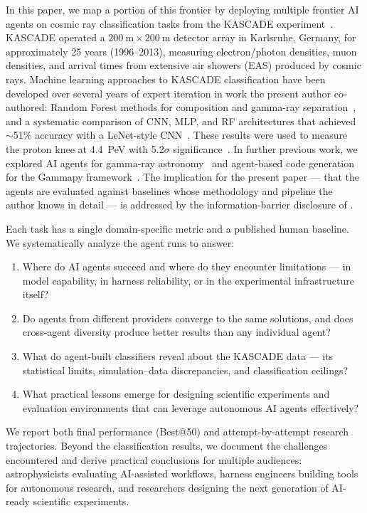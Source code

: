 \documentclass[universe,article,submit,pdftex,oneauthor]{Definitions/mdpi}
\begin{document}
In this paper, we map a portion of this frontier by deploying multiple frontier AI agents on cosmic ray classification tasks from the KASCADE experiment~\cite{kascade_exp}. KASCADE operated a $200~\mathrm{m} \times 200~\mathrm{m}$ detector array in Karlsruhe, Germany, for approximately 25 years (1996--2013), measuring electron/photon densities, muon densities, and arrival times from extensive air showers (EAS) produced by cosmic rays. Machine learning approaches to KASCADE classification have been developed over several years of expert iteration in work the present author co-authored: Random Forest methods for composition and gamma-ray separation~\cite{kascade_icrc}, and a systematic comparison of CNN, MLP, and RF architectures that achieved $\sim$51\% accuracy with a LeNet-style CNN~\cite{kascade_jinst}. These results were used to measure the proton knee at 4.4~PeV with 5.2$\sigma$ significance~\cite{kascade_jcap}. In further previous work, we explored AI agents for gamma-ray astronomy~\cite{kostunin_agents2025} and agent-based code generation for the Gammapy framework~\cite{gammapy_agents}. The implication for the present paper --- that the agents are evaluated against baselines whose methodology and pipeline the author knows in detail --- is addressed by the information-barrier disclosure of .

Each task has a single domain-specific metric and a published human baseline. We systematically analyze the agent runs to answer:
\begin{enumerate}
    \item Where do AI agents succeed and where do they encounter limitations --- in model capability, in harness reliability, or in the experimental infrastructure itself?
    \item Do agents from different providers converge to the same solutions, and does cross-agent diversity produce better results than any individual agent?
    \item What do agent-built classifiers reveal about the KASCADE data --- its statistical limits, simulation--data discrepancies, and classification ceilings?
    \item What practical lessons emerge for designing scientific experiments and evaluation environments that can leverage autonomous AI agents effectively?
\end{enumerate}

We report both final performance (Best@50) and attempt-by-attempt research trajectories. Beyond the classification results, we document the challenges encountered and derive practical conclusions for multiple audiences: astrophysicists evaluating AI-assisted workflows, harness engineers building tools for autonomous research, and researchers designing the next generation of AI-ready scientific experiments.
\end{document}
